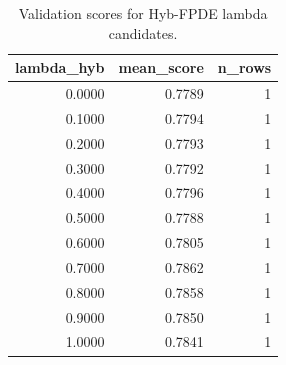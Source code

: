 \begin{table}[t]
\caption{Validation scores for Hyb-FPDE lambda candidates.}
\label{tab:lambda_distribution_computed}
\centering
\begin{tabular}{rrr}
\toprule
lambda\_hyb & mean\_score & n\_rows \\
\midrule
0.0000 & 0.7789 & 1 \\
0.1000 & 0.7794 & 1 \\
0.2000 & 0.7793 & 1 \\
0.3000 & 0.7792 & 1 \\
0.4000 & 0.7796 & 1 \\
0.5000 & 0.7788 & 1 \\
0.6000 & 0.7805 & 1 \\
0.7000 & 0.7862 & 1 \\
0.8000 & 0.7858 & 1 \\
0.9000 & 0.7850 & 1 \\
1.0000 & 0.7841 & 1 \\
\bottomrule
\end{tabular}

\end{table}
